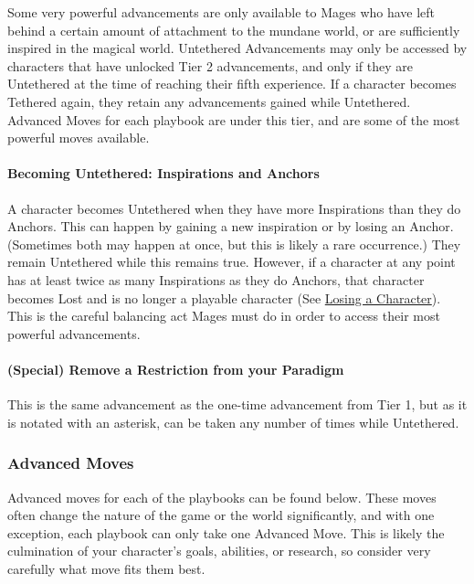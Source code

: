 \documentclass[
]{article}
\begin{document}
Some very powerful advancements are only available to Mages who have
left behind a certain amount of attachment to the mundane world, or are
sufficiently inspired in the magical world. Untethered Advancements may
only be accessed by characters that have unlocked Tier 2 advancements,
and only if they are Untethered at the time of reaching their fifth
experience. If a character becomes Tethered again, they retain any
advancements gained while Untethered. Advanced Moves for each playbook
are under this tier, and are some of the most powerful moves available.

\hypertarget{becoming-untethered-inspirations-and-anchors}{%
\paragraph{Becoming Untethered: Inspirations and
Anchors}\label{becoming-untethered-inspirations-and-anchors}}

A character becomes Untethered when they have more Inspirations than
they do Anchors. This can happen by gaining a new inspiration or by
losing an Anchor. (Sometimes both may happen at once, but this is likely
a rare occurrence.) They remain Untethered while this remains true.
However, if a character at any point has at least twice as many
Inspirations as they do Anchors, that character becomes Lost and is no
longer a playable character (See
\href{AnchorsandInspirationsLosingACharacter}{Losing a Character}). This
is the careful balancing act Mages must do in order to access their most
powerful advancements.

\hypertarget{special-remove-a-restriction-from-your-paradigm}{%
\paragraph{(Special) Remove a Restriction from your
Paradigm}\label{special-remove-a-restriction-from-your-paradigm}}

This is the same advancement as the one-time advancement from Tier 1,
but as it is notated with an asterisk, can be taken any number of times
while Untethered.

\label{Advanced Moves}

\hypertarget{advanced-moves-1}{%
\subsubsection{Advanced Moves}\label{advanced-moves-1}}

Advanced moves for each of the playbooks can be found below. These moves
often change the nature of the game or the world significantly, and with
one exception, each playbook can only take one Advanced Move. This is
likely the culmination of your character's goals, abilities, or
research, so consider very carefully what move fits them best.
\end{document}
